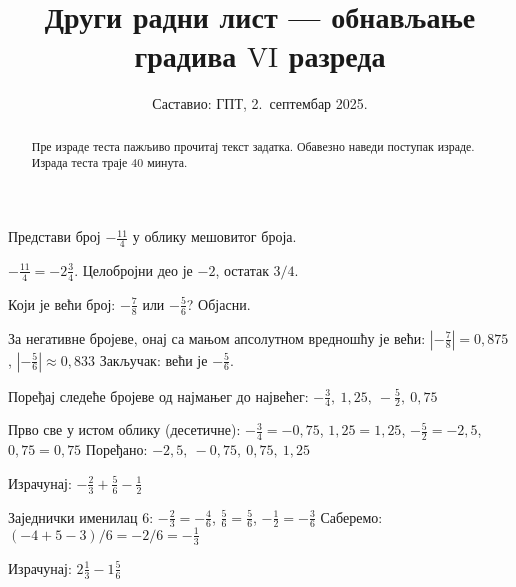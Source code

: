 \documentclass[11pt,a5paper,addpoints]{exam}
\title{Други радни лист — обнављање градива $\mathrm{VI}$ разреда}
\author{Саставио: ГПТ, 2.\ септембар 2025.}
\date{}
\begin{document}
\maketitle
\thispagestyle{headandfoot}

\begin{abstract}
Пре израде теста пажљиво прочитај текст задатка.
Обавезно наведи поступак израде.
Израда теста траје 40 минута.
\end{abstract}

\noindent \gradetable[h]

\begin{questions}

\question[2]
Представи број $-\frac{11}{4}$ у облику мешовитог броја.

\begin{solution}[\stretch 2]
$-\frac{11}{4} = -2\frac{3}{4}$.  
Целобројни део је $-2$, остатак $3/4$.
\end{solution}

\question[2]
Који је већи број: $-\frac{7}{8}$ или $-\frac{5}{6}$? Објасни.

\begin{solution}[\stretch 2]
За негативне бројеве, онај са мањом апсолутном вредношћу је већи:  
$|-\frac{7}{8}| = 0,875$, $|-\frac{5}{6}| \approx 0,833$  
Закључак: већи је $-\frac{5}{6}$.
\end{solution}

\ifprintanswers\else\newpage\fi

\question[3]
Поређај следеће бројеве од најмањег до највећег: $-\frac{3}{4},\ 1,25,\ -\frac{5}{2},\ 0,75$

\begin{solution}[\stretch 2]
Прво све у истом облику (десетичне):  
$-\frac{3}{4}=-0,75$, $1,25=1,25$, $-\frac{5}{2}=-2,5$, $0,75=0,75$  
Поређано: $-2,5,\ -0,75,\ 0,75,\ 1,25$
\end{solution}

\question[3]
Израчунај: $-\frac{2}{3} + \frac{5}{6} - \frac{1}{2}$

\begin{solution}[\stretch 2]
Заједнички именилац 6:  
$-\frac{2}{3}=-\frac{4}{6}$, $\frac{5}{6}=\frac{5}{6}$, $-\frac{1}{2}=-\frac{3}{6}$  
Саберемо: $(-4+5-3)/6 = -2/6=-\frac{1}{3}$
\end{solution}

\ifprintanswers\else\newpage\fi

\question[3]
Израчунај: $2\frac{1}{3}-1\frac{5}{6}$


\end{questions}
\end{document}
